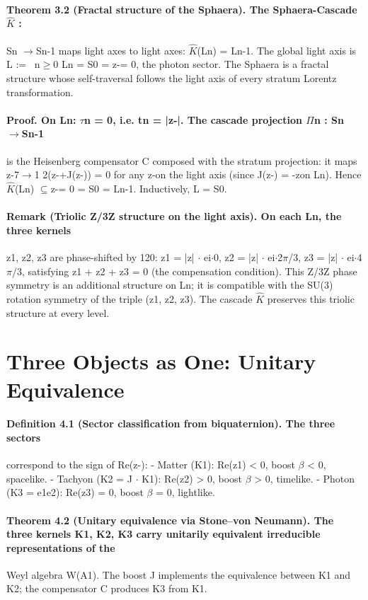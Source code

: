 \documentclass[12pt,a4paper]{article}
\begin{document}
\paragraph*{Theorem 3.2 (Fractal structure of the Sphaera). The Sphaera-Cascade $\hat K$ :}
Sn $\to$Sn-1 maps light axes to light axes: $\hat K$(Ln) = Ln-1. The global light axis is L := \ n$\geq$0 Ln = S0 = {z-= 0}, the photon sector. The Sphaera is a fractal structure whose self-traversal follows the light axis of every stratum Lorentz transformation.
\paragraph*{Proof. On Ln: $\tau$n = 0, i.e. tn = |z-|. The cascade projection $\Pi$n : Sn $\to$Sn-1}
is the Heisenberg compensator C composed with the stratum projection: it maps z-7$\to$1 2(z-+J(z-)) = 0 for any z-on the light axis (since J(z-) = -zon Ln). Hence $\hat K$(Ln) $\subseteq${z-= 0} = S0 = Ln-1. Inductively, L = S0.
\paragraph*{Remark (Triolic Z/3Z structure on the light axis). On each Ln, the three kernels}
z1, z2, z3 are phase-shifted by 120: z1 = |z| $\cdot$ ei$\cdot$0, z2 = |z| $\cdot$ ei$\cdot$2$\pi$/3, z3 = |z| $\cdot$ ei$\cdot$4$\pi$/3, satisfying z1 + z2 + z3 = 0 (the compensation condition). This Z/3Z phase symmetry is an additional structure on Ln; it is compatible with the SU(3) rotation symmetry of the triple (z1, z2, z3). The cascade $\hat K$ preserves this triolic structure at every level.

\section{Three Objects as One: Unitary Equivalence}
\paragraph*{Definition 4.1 (Sector classification from biquaternion). The three sectors}
correspond to the sign of Re(z-):
- Matter (K1): Re(z1) < 0, boost $\beta$ < 0, spacelike.
- Tachyon (K2 = J $\cdot$ K1): Re(z2) > 0, boost $\beta$ > 0, timelike.
- Photon (K3 = e1e2): Re(z3) = 0, boost $\beta$ = 0, lightlike.
\paragraph*{Theorem 4.2 (Unitary equivalence via Stone--von Neumann). The three kernels K1, K2, K3 carry unitarily equivalent irreducible representations of the}
Weyl algebra W(A1). The boost J implements the equivalence between K1 and K2; the compensator C produces K3 from K1.
\end{document}
